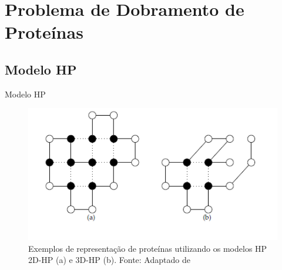 \section{Problema de Dobramento de Proteínas}

\subsection{Modelo HP}
\begin{frame}{Modelo HP}

	
		
		
		\begin{figure}[!htb]
			\centering
			\includegraphics[scale=.8]{figuras/modeloHPExemplo.png}
			\caption{Exemplos de representação de proteínas utilizando os modelos HP 2D-HP (a) e 3D-HP (b). Fonte: Adaptado de \cite{santanna2008} }
			\label{fig:exemploModeloHP}
		\end{figure}

\end{frame}




